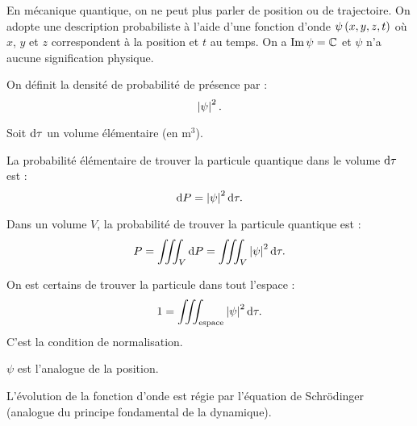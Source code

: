 En mécanique quantique, on ne peut plus parler de position ou de trajectoire. On adopte une description probabiliste à l'aide d'une fonction d'onde \(\psi\left(x,y,z,t\right)\) où \(x\), \(y\) et \(z\) correspondent à la position et \(t\) au temps. On a \(\operatorname{Im}\psi=\mathbb{C}\) et \(\psi\) n'a aucune signification physique.

On définit la densité de probabilité de présence par : \[\left\lvert\psi\right\rvert^2.\]

Soit \(\odif{\tau}\) un volume élémentaire (en \(\unit{\meter\cubed}\)).

La probabilité élémentaire de trouver la particule quantique dans le volume \(\odif{\tau}\) est : \[\odif{P}=\abs{\psi}^2\odif{\tau}.\]

Dans un volume \(V\), la probabilité de trouver la particule quantique est : \[P=\iiint_V\odif{P}=\iiint_V\abs{\psi}^2\odif{\tau}.\]

On est certains de trouver la particule dans tout l'espace : \[1=\iiint_{\text{espace}}\abs{\psi}^2\odif{\tau}.\] C'est la condition de normalisation.

\(\psi\) est l'analogue de la position.

L'évolution de la fonction d'onde est régie par l'équation de Schrödinger (analogue du principe fondamental de la dynamique).
